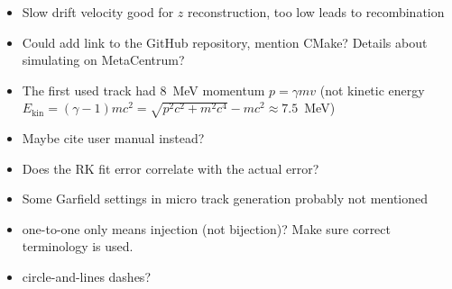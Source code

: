 {\begin{itemize}[topsep=4pt,itemsep=2pt]
				\item Slow drift velocity good for $z$ reconstruction, too low leads to recombination
				\item Could add link to the GitHub repository, mention CMake? Details about simulating on MetaCentrum?
				\item The first used track had 8~MeV momentum $p = \gamma m v$ (not kinetic energy $E_\text{kin} = (\gamma-1) m c^2 = \sqrt{p^2c^2+m^2c^4}-mc^2 \approx 7.5$~MeV)
				\item Maybe cite \garfieldpp user manual instead?
				\item Does the RK fit error correlate with the actual error?
				\item Some Garfield settings in micro track generation probably not mentioned
				\item one-to-one only means injection (not bijection)? Make sure correct terminology is used.
				\item circle-and-lines dashes?
			\end{itemize}
			}
